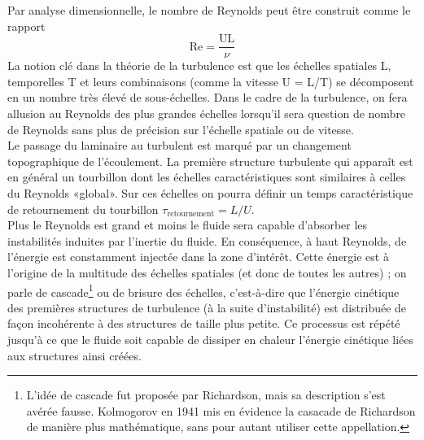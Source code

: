 \documentclass[a4paper,12pt]{article}
\newcommand{\cad}{c'est-à-dire}
\numberwithin{equation}{section} %
\begin{document}
\noindent  Par analyse dimensionnelle, le nombre de Reynolds peut être construit comme le rapport 
\begin{equation}
 \text{Re} = \frac{\text{UL}}{\nu}
\end{equation} 
 La notion clé dans la théorie de la turbulence est que les échelles spatiales L, temporelles T et leurs combinaisons (comme la vitesse U = L/T) se décomposent en un nombre très élevé de sous-échelles.
Dans le cadre de la turbulence, on fera allusion au Reynolds des plus grandes échelles lorsqu'il sera question de nombre de Reynolds sans plus de précision sur l'échelle spatiale ou de vitesse. \\
Le passage du laminaire au turbulent est marqué par un changement topographique de l'écoulement. La première structure turbulente qui apparaît est en général un tourbillon dont les échelles caractéristiques sont similaires à celles du Reynolds «global». Sur ces échelles on pourra définir un temps caractéristique de retournement du tourbillon $\tau_{\text{retournement}} = L/U$. \\
Plus le Reynolds est grand et moins le fluide sera capable d'absorber les instabilités induites par l'inertie du fluide. En conséquence, à haut Reynolds, de l'énergie est constamment injectée dans la zone d'intérêt. Cette énergie est à l'origine de la multitude des échelles spatiales (et donc de toutes les autres) ; on parle de cascade\footnote{L'idée de cascade fut proposée par Richardson, mais sa description s'est avérée fausse. Kolmogorov en 1941 mis en évidence la casacade de Richardson de manière plus mathématique, sans pour autant utiliser cette appellation.} ou de brisure des échelles, \cad $ $ que l'énergie cinétique des premières structures de turbulence (à la suite d'instabilité) est distribuée de façon incohérente à des structures de taille plus petite. Ce processus est répété jusqu'à ce que le fluide soit capable de dissiper en chaleur l'énergie cinétique liées aux structures ainsi créées. \\
\end{document}
